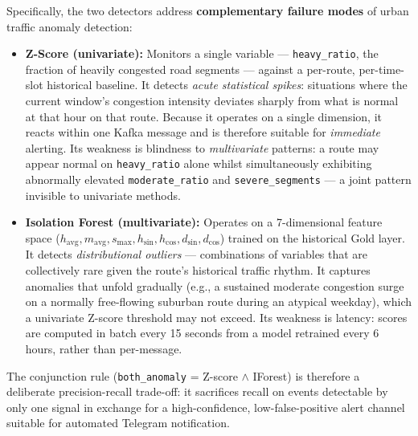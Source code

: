   Specifically, the two detectors address \textbf{complementary failure
  modes} of urban traffic anomaly detection:

  \begin{itemize}
    \item \textbf{Z-Score (univariate):} Monitors a single variable ---
    \texttt{heavy\_ratio}, the fraction of heavily congested road segments
    --- against a per-route, per-time-slot historical baseline. It detects
    \textit{acute statistical spikes}: situations where the current
    window's congestion intensity deviates sharply from what is normal at
    that hour on that route. Because it operates on a single dimension, it
    reacts within one Kafka message and is therefore suitable for
    \textit{immediate} alerting. Its weakness is blindness to
    \textit{multivariate} patterns: a route may appear normal on
    \texttt{heavy\_ratio} alone whilst simultaneously exhibiting
    abnormally elevated \texttt{moderate\_ratio} and
    \texttt{severe\_segments} --- a joint pattern invisible to univariate
    methods.

    \item \textbf{Isolation Forest (multivariate):} Operates on a
    7-dimensional feature space ($h_{\text{avg}}, m_{\text{avg}},
    s_{\text{max}}, h_{\sin}, h_{\cos}, d_{\sin}, d_{\cos}$) trained on
    the historical Gold layer. It detects \textit{distributional outliers}
    --- combinations of variables that are collectively rare given the
    route's historical traffic rhythm. It captures anomalies that unfold
    gradually (e.g., a sustained moderate congestion surge on a normally
    free-flowing suburban route during an atypical weekday), which a
    univariate Z-score threshold may not exceed. Its weakness is latency:
    scores are computed in batch every 15 seconds from a model retrained
    every 6 hours, rather than per-message.
  \end{itemize}

  The conjunction rule (\texttt{both\_anomaly} = Z-score $\wedge$
  IForest) is therefore a deliberate precision-recall trade-off: it
  sacrifices recall on events detectable by only one signal in exchange
  for a high-confidence, low-false-positive alert channel suitable for
  automated Telegram notification.                                                                                                                             
                                                                                                                                                          
